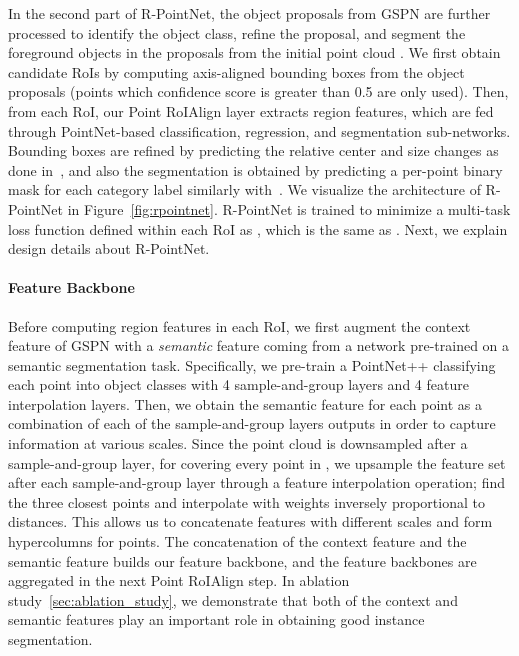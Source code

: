 \documentclass[10pt,twocolumn,letterpaper]{article}
\begin{document}
In the second part of R-PointNet, the object proposals from GSPN are further processed to identify the object class, refine the proposal, and segment the foreground objects in the proposals from the initial point cloud .
We first obtain candidate RoIs by computing axis-aligned bounding boxes from the object proposals (points which confidence score  is greater than 0.5 are only used). Then, from each RoI, our Point RoIAlign layer extracts region features, which are fed through PointNet-based classification, regression, and segmentation sub-networks.
Bounding boxes are refined by predicting the relative center and size changes as done in~\cite{ren2015faster}, and also the segmentation is obtained by predicting a per-point binary mask for each category label similarly with~\cite{he2017mask}.
We visualize the architecture of R-PointNet in Figure~\ref{fig:rpointnet}. R-PointNet is trained to minimize a multi-task loss function defined within each RoI as , which is the same as \cite{he2017mask}. Next, we explain design details about R-PointNet.



\vspace{-\baselineskip}
\paragraph{Feature Backbone}
Before computing region features in each RoI, we first augment the context feature  of GSPN with a \emph{semantic} feature  coming from a network pre-trained on a semantic segmentation task. Specifically, we pre-train a PointNet++ classifying each point into object classes with 4 sample-and-group layers and 4 feature interpolation layers. Then, we obtain the semantic feature for each point as a combination of each of the sample-and-group layers outputs in order to capture information at various scales.
Since the point cloud is downsampled after a sample-and-group layer, for covering every point in , we upsample the feature set after each sample-and-group layer through a feature interpolation operation; find the three closest points and interpolate with weights inversely proportional to distances. This allows us to concatenate features with different scales and form hypercolumns \cite{hariharan2015hypercolumns} for points. The concatenation of the context feature  and the semantic feature  builds our feature backbone, and the feature backbones are aggregated in the next Point RoIAlign step. In ablation study~\ref{sec:ablation_study}, we demonstrate that both of the context and semantic features play an important role in obtaining good instance segmentation.
\end{document}
